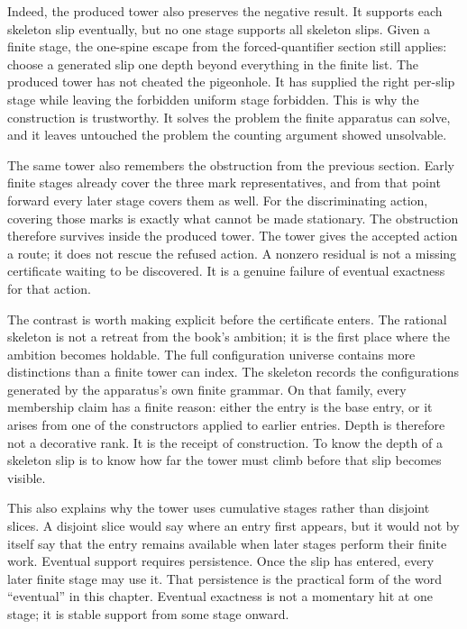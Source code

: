 Indeed, the produced tower also preserves the negative result. It supports each
skeleton slip eventually, but no one stage supports all skeleton slips. Given a
finite stage, the one-spine escape from the forced-quantifier section still
applies: choose a generated slip one depth beyond everything in the finite
list. The produced tower has not cheated the pigeonhole. It has supplied the
right per-slip stage while leaving the forbidden uniform stage forbidden. This
is why the construction is trustworthy. It solves the problem the finite
apparatus can solve, and it leaves untouched the problem the counting argument
showed unsolvable.

The same tower also remembers the obstruction from the previous section. Early
finite stages already cover the three mark representatives, and from that point
forward every later stage covers them as well. For the discriminating action,
covering those marks is exactly what cannot be made stationary. The obstruction
therefore survives inside the produced tower. The tower gives the accepted
action a route; it does not rescue the refused action. A nonzero residual is
not a missing certificate waiting to be discovered. It is a genuine failure of
eventual exactness for that action.

The contrast is worth making explicit before the certificate enters. The
rational skeleton is not a retreat from the book's ambition; it is the first
place where the ambition becomes holdable. The full configuration universe
contains more distinctions than a finite tower can index. The skeleton records
the configurations generated by the apparatus's own finite grammar. On that
family, every membership claim has a finite reason: either the entry is the base
entry, or it arises from one of the constructors applied to earlier entries.
Depth is therefore not a decorative rank. It is the receipt of construction. To
know the depth of a skeleton slip is to know how far the tower must climb before
that slip becomes visible.

This also explains why the tower uses cumulative stages rather than disjoint
slices. A disjoint slice would say where an entry first appears, but it would
not by itself say that the entry remains available when later stages perform
their finite work. Eventual support requires persistence. Once the slip has
entered, every later finite stage may use it. That persistence is the practical
form of the word ``eventual'' in this chapter. Eventual exactness is not a
momentary hit at one stage; it is stable support from some stage onward.

